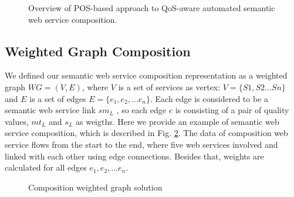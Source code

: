 \documentclass{IEEEtran}
\begin{document}
\begin{figure}[h]
\centering
{}
 \caption{Overview of POS-based approach to QoS-aware automated semantic web service composition.}
 \label{overview}
\end{figure}

\subsection{Weighted Graph Composition}

We defined our semantic web service composition representation as a weighted graph $WG = (V, E)$, where $V$ is a set of services as vertex: $V=\{S1, S2...Sn \}$ and $E$ is a set of edges $E = \{e_{1}, e_{2},... e_{n} \}$. Each edge is considered to be a semantic web service link $sm_{L}$ , so each edge $e$ is consisting of a pair of quality values, $mt_{L}$ and $s_{L}$ as weigths. Here we provide an example of semantic web service composition, which is described in Fig. \ref{wscs}. The data of composition web service flows from the start to the end, where five web services involved and linked with each other using edge connections. Besides that, weights are calculated for all edges $e_{1}, e_{2},... e_{n}$.

\begin{figure}[h]
\centering
{}
 \caption{Composition weighted graph solution}
 \label{wscs}
\end{figure}
\end{document}
